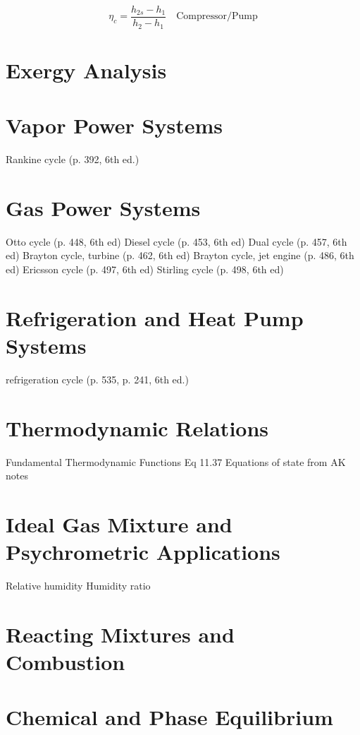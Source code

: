 \documentclass[paper=letter, fontsize=11pt]{scrartcl}
\numberwithin{equation}{section}        %
\numberwithin{figure}{section}          %
\numberwithin{table}{section}               %
\begin{document}
\begin{equation}
    \eta_c = \frac{h_{2s} - h_1}{h_2 - h_1}\quad\text{Compressor/Pump}
\end{equation}

\newpage
\section{Exergy Analysis}

\section{Vapor Power Systems}
    Rankine cycle (p. 392, 6th ed.)

\section{Gas Power Systems}
    Otto cycle (p. 448, 6th ed)
    Diesel cycle (p. 453, 6th ed)
    Dual cycle (p. 457, 6th ed)
    Brayton cycle, turbine (p. 462, 6th ed)
    Brayton cycle, jet engine (p. 486, 6th ed)
    Ericsson cycle (p. 497, 6th ed)
    Stirling cycle (p. 498, 6th ed)

\section{Refrigeration and Heat Pump Systems}
    refrigeration cycle (p. 535, p. 241, 6th ed.)

\section{Thermodynamic Relations}
    Fundamental Thermodynamic Functions Eq 11.37
    Equations of state from AK notes

\section{Ideal Gas Mixture and Psychrometric Applications}
    Relative humidity
    Humidity ratio

\section{Reacting Mixtures and Combustion}

\section{Chemical and Phase Equilibrium}

\end{document}
